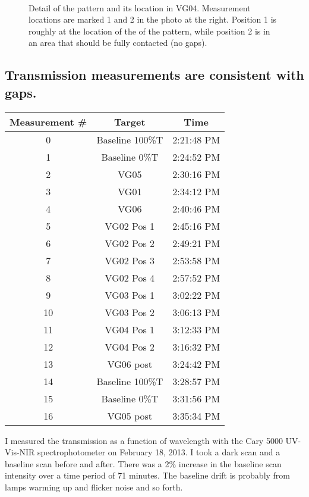 \begin{figure}[h!] 
\begin{center}
\ 
\caption[VG04 Detail]{Detail of the pattern and its location in VG04.  Measurement locations are marked 1 and 2 in the photo at the right.  Position 1 is roughly at the location of the of the pattern, while position 2 is in an area that should be fully contacted (no gaps). }
\label{fig:VG04detail}
\end{center}
\end{figure}

\subsection{Transmission measurements are consistent with gaps.}

\begin{center}
    \begin{tabular}{c c c}
    \hline
    Measurement \# & Target & Time \\ 
        \hline
       0& Baseline 100\%T  & 2:21:48 PM \\
       1 &Baseline 0\%T  & 2:24:52 PM\\
       2 &VG05  & 2:30:16 PM\\
       3 &VG01  & 2:34:12 PM\\
       4 &VG06  & 2:40:46 PM\\
       5 &VG02 Pos 1  & 2:45:16 PM\\
       6 &VG02 Pos 2  & 2:49:21 PM\\
       7 &VG02 Pos 3  & 2:53:58 PM\\
       8 &VG02 Pos 4  & 2:57:52 PM\\
       9 &VG03 Pos 1  & 3:02:22 PM\\
      10& VG03 Pos 2  & 3:06:13 PM\\
      11 &VG04 Pos 1  & 3:12:33 PM\\
      12 &VG04 Pos 2  & 3:16:32 PM\\
      13 &VG06 post  & 3:24:42 PM\\
      14 &Baseline 100\%T  & 3:28:57 PM\\
      15 &Baseline 0\%T  & 3:31:56 PM\\
      16 &VG05 post  & 3:35:34 PM\\
    \hline
    \end{tabular}
\end{center}

I measured the transmission as a function of wavelength with the Cary 5000 UV-Vis-NIR spectrophotometer on February 18, 2013.  I took a dark scan and a baseline scan before and after.  There was a 2\% increase in the baseline scan intensity over a time period of 71 minutes.  The baseline drift is probably from lamps warming up and flicker noise and so forth.

